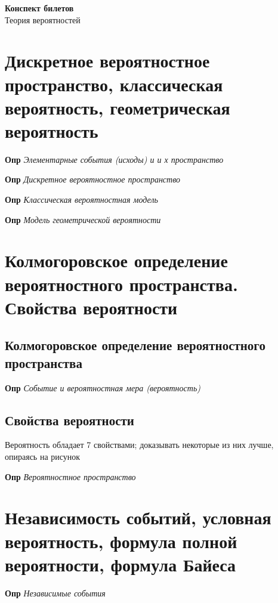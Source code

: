 \documentclass[a4paper, 14pt]{article}
\begin{document}
{\huge
    \begin{center}
    {\textbf{Конспект билетов}}
        \\
        Теория вероятностей
    \end{center}
}
    \tableofcontents \newpage
    
    \section{Дискретное вероятностное пространство, классическая вероятность, геометрическая вероятность}
    
    \textbf{Опр} \textit{Элементарные события (исходы) и и х пространство}
    
    \textbf{Опр} \textit{Дискретное вероятностное пространство}
    
    \textbf{Опр} \textit{Классическая вероятностная модель}
    
    \textbf{Опр} \textit{Модель геометрической вероятности}
    
    \section{Колмогоровское определение вероятностного пространства.
    Свойства вероятности}
    
    \subsection{Колмогоровское определение вероятностного пространства}
    
    \textbf{Опр} \textit{Событие и вероятностная мера (вероятность)}
    
    \subsection{Свойства вероятности}
    
    Вероятность обладает 7 свойствами; доказывать некоторые из них лучше, опираясь на рисунок
    
    \textbf{Опр} \textit{Вероятностное пространство}
    
    \section{Независимость событий, условная вероятность, формула полной вероятности, формула Байеса}
    
    \textbf{Опр} \textit{Независимые события}
    
\end{document}
